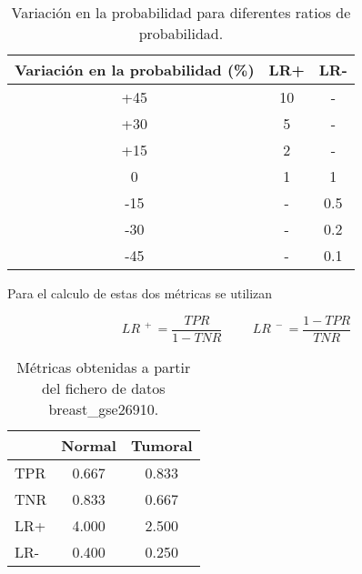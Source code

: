 \begin{table}[ht]
    \centering
    \begin{tabular}[t]{ccc}
        Variación en la probabilidad (\%) & \hspace{20pt}LR+\hspace{20pt} & LR- \\\hline
        +45                              & 10                            & -   \\\hline
        +30                              & 5                             & -   \\\hline
        +15                              & 2                             & -   \\\hline
        0                                & 1                             & 1   \\\hline
        -15                              & -                             & 0.5 \\\hline
        -30                              & -                             & 0.2 \\\hline
        -45                              & -                             & 0.1 \\\hline
    \end{tabular}
    \caption{Variación en la probabilidad para diferentes ratios de probabilidad.}
    \label{tab:2}
\end{table}

Para el calculo de estas dos métricas se utilizan

\bigbreak
\begin{equation}\tag*{}
    LR^{\phantom{.}+}    = \frac{TPR}{1-TNR}
    \hspace{1cm}
    LR^{\phantom{.}-} = \frac{1-TPR}{TNR}
\end{equation}
\bigbreak

\begin{table}[ht]
    \centering
    \begin{tabular}[t]{lcc}
            & \hspace{20pt}Normal\hspace{20pt} & Tumoral \\\hline
        TPR & 0.667                            & 0.833   \\\hline
        TNR & 0.833                            & 0.667   \\\hline
        LR+ & 4.000                            & 2.500   \\\hline
        LR- & 0.400                            & 0.250   \\\hline
    \end{tabular}
    \caption{Métricas obtenidas a partir del fichero de datos breast\_gse26910.}
    \label{tab:3}
\end{table}


